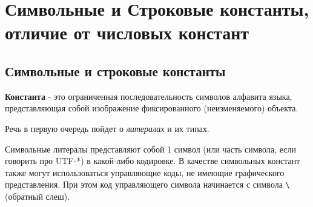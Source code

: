 \section{Символьные и Строковые константы, отличие от числовых
констант}\label{ux441ux438ux43cux432ux43eux43bux44cux43dux44bux435-ux438-ux441ux442ux440ux43eux43aux43eux432ux44bux435-ux43aux43eux43dux441ux442ux430ux43dux442ux44b-ux43eux442ux43bux438ux447ux438ux435-ux43eux442-ux447ux438ux441ux43bux43eux432ux44bux445-ux43aux43eux43dux441ux442ux430ux43dux442}

\subsection{Символьные и строковые
константы}\label{ux441ux438ux43cux432ux43eux43bux44cux43dux44bux435-ux438-ux441ux442ux440ux43eux43aux43eux432ux44bux435-ux43aux43eux43dux441ux442ux430ux43dux442ux44b}

\textbf{Константа} - это ограниченная последовательность символов
алфавита языка, представляющая собой изображение фиксированного
(неизменяемого) объекта.

Речь в первую очередь пойдет о \emph{литералах} и их типах.

Символьные литералы представляют собой 1 символ (или часть символа, если
говорить про UTF-*) в какой-либо кодировке. В качестве символьных
констант также могут использоваться управляющие коды, не имеющие
графического представления. При этом код управляющего символа начинается
с символа \texttt{\textbackslash{}}(обратный слеш).

